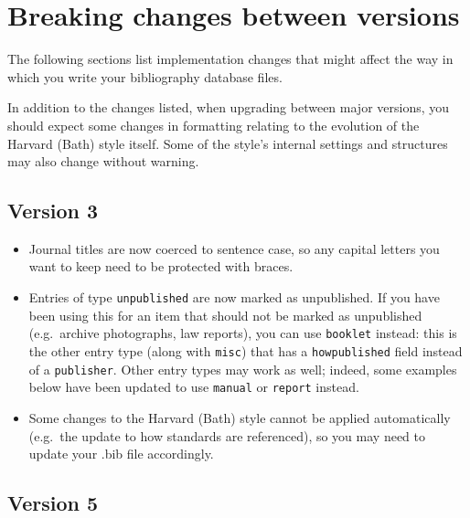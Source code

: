 \documentclass[10pt,a4paper]{article}
\begin{document}
\section{Breaking changes between versions}

The following sections list implementation changes that might affect the way
in which you write your bibliography database files.

In addition to the changes listed, when upgrading between major versions,
you should expect some changes in formatting relating to the evolution of the
Harvard (Bath) style itself. Some of the style's internal settings and
structures may also change without warning.

\subsection{Version 3}

\begin{itemize}
\item
  Journal titles are now coerced to sentence case, so any capital letters you
  want to keep need to be protected with braces.
\item
  Entries of type \texttt{unpublished} are now marked as unpublished. If you
  have been using this for an item that should not be marked as unpublished
  (e.g.~archive photographs, law reports), you can use \texttt{booklet} instead:
  this is the other entry type (along with \texttt{misc}) that has a
  \texttt{howpublished} field instead of a \texttt{publisher}.
  Other entry types may work as well; indeed, some examples below have been updated to use \texttt{manual} or \texttt{report} instead.
\item
  Some changes to the Harvard (Bath) style cannot be applied automatically
  (e.g.~the update to how standards are referenced), so you may need to update
  your .bib file accordingly.
\end{itemize}

\subsection{Version 5}
\end{document}
